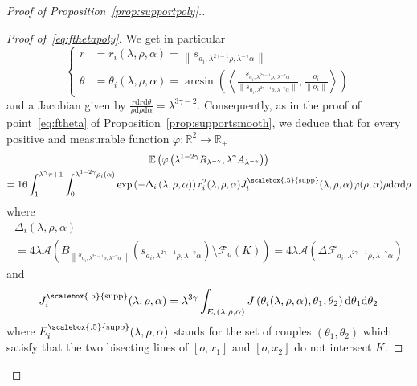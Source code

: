 \documentclass[10pt]{amsart}
\theoremstyle{definition}\newtheorem{defi}[theo]{Definition}\newtheorem{rema}[theo]{Remark}\newtheorem{exam}[theo]{Example}\newtheorem{exem}[theo]{Example}\newtheorem{nota}[theo]{Notation}
\newcommand{\cA}{\mathcal{A}}
\newcommand{\cF}{\mathcal{F}}
\newcommand{\dd}{\mathrm{d}}
\newcommand{\E}{\mathbb{E}}
\newcommand{\R}{\mathbb{R}}
\DeclareMathOperator{\supp}{\scalebox{.5}{supp}}
\newcommand{\noi}{\noindent}
\newenvironment*{prooff}{\begin{proof}}{\let\qed\relax\end{proof}}
\begin{document}
\begin{proof}[{Proof of Proposition~\ref{prop:supportpoly}.}]
\begin{prooff}[{Proof of~\eqref{eq:fthetapoly}}]
We get in particular
\[
\begin{cases}
r & =  r_i(\lambda,\rho,\alpha)=\left\|s_{a_i,\lambda^{2\gamma-1}\rho,\lambda^{-\gamma}\alpha}\right\| \\
\theta & =  \theta_i(\lambda,\rho,\alpha) = \arcsin\left(\left\langle \frac{s_{a_i,\lambda^{2\gamma-1}\rho,\,\lambda^{-\gamma}\alpha}}{\bigl\|s_{a_i,\lambda^{2\gamma-1}\rho,\lambda^{-\gamma}\alpha}\bigr\|},\frac{o_i}{\|o_i\|}\right\rangle\right)
\end{cases}
\]
and a Jacobian given by $\tfrac{r\dd r \dd \theta }{\rho\dd\rho \dd\alpha} = \lambda^{3\gamma-2}$. Consequently, as in the proof of point~\eqref{eq:ftheta} of Proposition~\ref{prop:supportsmooth}, we deduce that for every positive and measurable function $\varphi:\R^2\longrightarrow \R_+$
\begin{multline*}
\E\left(\varphi\left(\lambda^{1-2\gamma}R_{\lambda^{-\gamma}}, \lambda^{\gamma}A_{\lambda^{-\gamma}}\right)\right) \\
= 16\int_1^{\lambda^{\gamma}\pi+1}\int_0^{\lambda^{1-2\gamma}\rho_i(\alpha)}\exp\left(-\Delta_i\left(\lambda,\rho,\alpha\right)\right)r_i^2(\lambda,\rho,\alpha) J^{\supp}_i(\lambda,\rho,\alpha)\varphi(\rho,\alpha)\rho\dd\alpha\dd \rho \\
\end{multline*}
where
\begin{multline*}
\Delta_i(\lambda,\rho,\alpha)\\
= 4\lambda\cA\left(B_{\left\|s_{a_i,\lambda^{2\gamma-1}\rho,\lambda^{-\gamma}\alpha}\right\|}\left(s_{a_i,\lambda^{2\gamma-1}\rho,\lambda^{-\gamma}\alpha}\right)\setminus \cF_o(K)\right) = 4\lambda\cA\left(\Delta \cF_{a_i,\lambda^{2\gamma-1}\rho,\lambda^{-\gamma}\alpha}\right)
\end{multline*}
and
\[
J^{\supp}_i(\lambda,\rho,\alpha)=\lambda^{3\gamma}\int_{E_i(\lambda,\rho,\alpha)} J\left(\theta_i(\lambda,\rho,\alpha),\theta_1,\theta_2\right)\dd \theta_1\dd \theta_2
\]
where $E_i^{\supp}(\lambda,\rho,\alpha)$ stands for the set of couples $(\theta_1,\theta_2)$ which satisfy that the two bisecting lines of $[o,x_1]$ and $[o,x_2]$ do not intersect $K$.


\end{prooff}
\end{proof}
\end{document}
